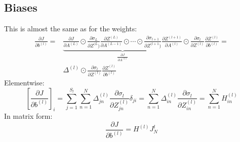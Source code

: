 \documentclass[12pt, a4paper]{article}
\numberwithin{equation}{section}
\begin{document}
\subsection{Biases}
This is almost the same as for the weights:
\begin{align}
\frac{\partial J}{\partial b^{(l)}}=&\underbrace{\frac{\partial J}{\partial A^{(L)}}\odot\frac{\partial\sigma_L}{\partial Z^{(L})}\frac{\partial Z^{(L)}}{\partial A^{(L-1)}}\odot\cdots\odot\frac{\partial\sigma_{l+1}}{\partial Z^{(l+1})}\frac{\partial Z^{(l+1)}}{\partial A^{(l)}}}_{\frac{\partial J}{\partial A^{(l)}}}\odot\frac{\partial\sigma_l}{\partial Z^{(l)}}\frac{\partial Z^{(l)}}{\partial b^{(l)}}=\\
&\Delta^{(l)}\odot\frac{\partial\sigma_l}{\partial Z^{(l)}}\frac{\partial Z^{(l)}}{\partial b^{(l)}}
\end{align}
Elementwise:
\begin{equation}
\left[\frac{\partial J}{\partial b^{(l)}}\right]_i=\sum_{j=1}^{S_l}\sum_{n=1}^N\Delta^{(l)}_{jn}\frac{\partial\sigma_l}{\partial Z^{(l)}_{jn}}\delta_{ji}=\sum_{n=1}^N\Delta^{(l)}_{in}\frac{\partial\sigma_l}{\partial Z^{(l)}_{in}}=\sum_{n=1}^N H^{(l)}_{in}
\end{equation}
In matrix form:
\begin{equation}
\frac{\partial J}{\partial b^{(l)}}=H^{(l)}J^t_N
\end{equation}
\end{document}

